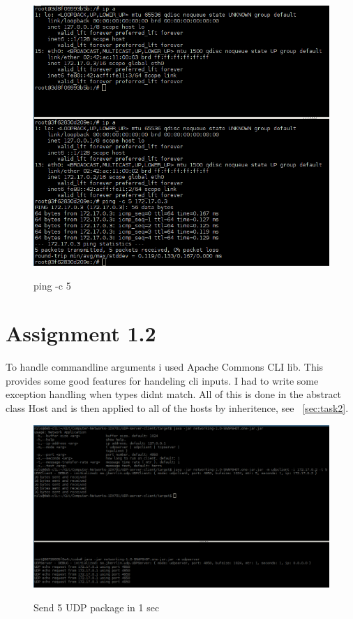 \documentclass[a4paper,12pt]{article} %
\begin{document}
{\begin{figure}[H]
    \centering  
    \includegraphics[scale=0.5]{img/assignment11.png}
	\label{fig:assignment11}
	\caption{ping -c 5}
\end{figure}



\section{Assignment 1.2}

To handle commandline arguments i used Apache Commons CLI lib.
This provides some good features for handeling cli inputs.
I had to write some exception handling when types didnt match.
All of this is done in the abstract class Host and is then applied to all
of the hosts by inheritence, see ~\ref{sec:task2}.

\begin{figure}[H]
    \centering  
    \includegraphics[scale=0.35]{img/assignment12.png}
	\label{fig:assignment12}
	\caption{Send 5 UDP package in 1 sec}
\end{figure}


}
\end{document}
